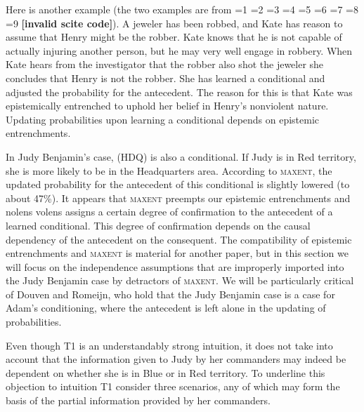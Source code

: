\documentclass[smallextended]{svjour3}       %
\newcommand{\PageP}{p.~}
\newcommand{\PageP}{}
\newcommand{\scite}[3]{\ifnum#1=1\cite{#2}\else
\ifnum#1=2\cite[{\PageP}~#3]{#2}\else
\ifnum#1=3\cite[{\PageP}~#3]{#2}\else
\ifnum#1=4\cite{#2}\else
\ifnum#1=5\cite{#2}\else
\ifnum#1=6\cite[{\PageP}~#3]{#2}\else
\ifnum#1=7\cite{#2}\else
\ifnum#1=8\cite[{\PageP}~#3]{#2}\else
\ifnum#1=9\cite[{\PageP}~#3]{#2}\else
\textbf{[invalid scite code]}\fi\fi\fi\fi\fi\fi\fi\fi\fi}
\begin{document}
Here is another example (the two examples are from
\scite{7}{douvenromeijn09}{}). A jeweler has been robbed, and Kate has
  reason to assume that Henry might be the robber. Kate knows that he
  is not capable of actually injuring another person, but he may very
  well engage in robbery. When Kate hears from the investigator that
  the robber also shot the jeweler she concludes that Henry is not the
  robber. She has learned a conditional and adjusted the probability
  for the antecedent. The reason for this is that Kate was
  epistemically entrenched to uphold her belief in Henry's nonviolent
  nature. Updating probabilities upon learning a conditional depends
  on epistemic entrenchments.

In Judy Benjamin's case, (HDQ) is also a conditional. If Judy is in
Red territory, she is more likely to be in the Headquarters area.
According to \textsc{maxent}, the updated probability for the
antecedent of this conditional is slightly lowered (to about 47\%).
It appears that \textsc{maxent} preempts our epistemic entrenchments
and nolens volens assigns a certain degree of confirmation to the
antecedent of a learned conditional. This degree of confirmation
depends on the causal dependency of the antecedent on the
consequent. The compatibility of epistemic entrenchments and
\textsc{maxent} is material for another paper, but in this section
we will focus on the independence assumptions that are improperly
imported into the Judy Benjamin case by detractors of
\textsc{maxent}. We will be particularly critical of Douven and
Romeijn, who hold that the Judy Benjamin case is a case for Adam's
conditioning, where the antecedent is left alone in the updating of
probabilities.

Even though T1 is an understandably strong intuition, it does
not take into account that the information given to Judy by her
commanders may indeed be dependent on whether she is in Blue or in Red
territory. To underline this objection to intuition T1 consider three
scenarios, any of which may form the basis of the partial information
provided by her commanders.
\end{document}

